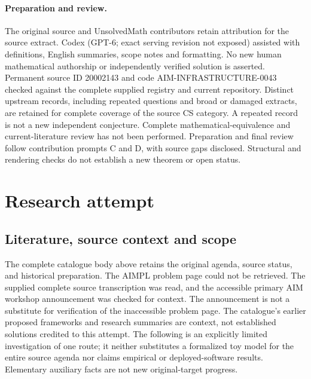 \documentclass[11pt]{article}
\begin{document}
\paragraph{Preparation and review.}
The original source and UnsolvedMath contributors retain attribution for the source extract. Codex (GPT-6; exact serving revision not exposed) assisted with definitions, English summaries, scope notes and formatting. No new human mathematical authorship or independently verified solution is asserted. Permanent source ID 20002143 and code AIM-INFRASTRUCTURE-0043 checked against the complete supplied registry and current repository. Distinct upstream records, including repeated questions and broad or damaged extracts, are retained for complete coverage of the source CS category. A repeated record is not a new independent conjecture. Complete mathematical-equivalence and current-literature review has not been performed. Preparation and final review follow contribution prompts C and D, with source gaps disclosed. Structural and rendering checks do not establish a new theorem or open status.
\label{end:20002143}

\section{Research attempt}
\subsection{Literature, source context and scope}
The complete catalogue body above retains the original agenda, source status, and historical preparation. The AIMPL problem page could not be retrieved. The supplied complete source transcription was read, and the accessible primary AIM workshop announcement was checked for context. The announcement is not a substitute for verification of the inaccessible problem page. The catalogue's earlier proposed frameworks and research summaries are context, not established solutions credited to this attempt. The following is an explicitly limited investigation of one route; it neither substitutes a formalized toy model for the entire source agenda nor claims empirical or deployed-software results. Elementary auxiliary facts are not new original-target progress.
\end{document}
